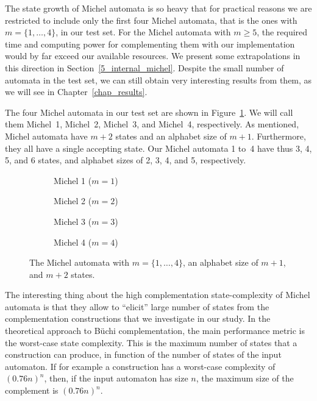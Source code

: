 The state growth of Michel automata is so heavy that for practical reasons we are restricted to include only the first four Michel automata, that is the ones with $m=\{1,\dots,4\}$, in our test set. For the Michel automata with $m \geq 5$, the required time and computing power for complementing them with our implementation would by far exceed our available resources. We present some extrapolations in this direction in Section~\ref{5_internal_michel}. Despite the small number of automata in the test set, we can still obtain very interesting results from them, as we will see in Chapter~\ref{chap_results}.

The four Michel automata in our test set are shown in Figure~\ref{michel_automata}. We will call them Michel~1, Michel~2, Michel~3, and Michel~4, respectively. As mentioned, Michel automata have $m+2$ states and an alphabet size of $m+1$. Furthermore, they all have a single accepting state. Our Michel automata 1 to~4 have thus 3, 4, 5, and 6 states, and alphabet sizes of 2, 3, 4, and 5, respectively.

\renewcommand{\subwidth}{0.42}
\begin{figure}[htb!]
\centering
  \begin{subfigure}[t]{\subwidth\textwidth}
  \MichelOne
  \caption{Michel 1 ($m=1$)}
  \end{subfigure}
  \begin{subfigure}[t]{\subwidth\textwidth}
  \MichelTwo
  \caption{Michel 2 ($m=2$)}
  \end{subfigure}

  \begin{subfigure}[b]{\subwidth\textwidth}
  \MichelThree
  \caption{Michel 3 ($m=3$)}
  \end{subfigure}
  \begin{subfigure}[b]{\subwidth\textwidth}
  \MichelFour
  \caption{Michel 4 ($m=4$)}
  \end{subfigure}
\caption{The Michel automata with $m = \{1,\dots,4\}$, an alphabet size of $m+1$, and $m+2$ states.}
\label{michel_automata}
\end{figure}

The interesting thing about the high complementation state-complexity of Michel automata is that they allow to ``elicit'' large number of states from the complementation constructions that we investigate in our study. In the theoretical approach to Büchi complementation, the main performance metric is the worst-case state complexity. This is the maximum number of states that a construction can produce, in function of the number of states of the input automaton. If for example a construction has a worst-case complexity of $(0.76n)^n$, then, if the input automaton has size $n$, the maximum size of the complement is $(0.76n)^n$.

